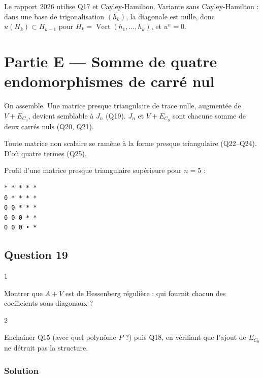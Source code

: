 \documentclass[11pt,a4paper]{article}
\begin{document}
\begin{methode}

Le rapport 2026 utilise Q17 et Cayley-Hamilton. Variante sans Cayley-Hamilton : dans une base de trigonalisation \((h_k)\), la diagonale est nulle, donc \(u(H_k)\subset H_{k-1}\) pour \(H_k=\operatorname{Vect}(h_1,\dots,h_k)\), et \(u^n=0\).

\end{methode}

\hypertarget{partie-e-somme-de-quatre-endomorphismes-de-carruxe9-nul}{%
\section{Partie E --- Somme de quatre endomorphismes de carré nul}\label{partie-e-somme-de-quatre-endomorphismes-de-carruxe9-nul}}

On assemble. Une matrice presque triangulaire de trace nulle, augmentée de \(V+E_{C_0}\), devient semblable à \(J_n\) (Q19). \(J_n\) et \(V+E_{C_0}\) sont chacune somme de deux carrés nuls (Q20, Q21).

Toute matrice non scalaire se ramène à la forme presque triangulaire (Q22--Q24). D'où quatre termes (Q25).

Profil d'une matrice presque triangulaire supérieure pour \(n=5\) :

\begin{lstlisting}
* * * * *
0 * * * *
0 0 * * *
0 0 0 * *
0 0 0 • *
\end{lstlisting}

\hypertarget{question-19}{%
\subsection{Question 19}\label{question-19}}

\begin{indication}{1}

Montrer que \(A+V\) est de Hessenberg régulière : qui fournit chacun des coefficients sous-diagonaux ?

\end{indication}

\begin{indication}{2}

Enchaîner Q15 (avec quel polynôme \(P\) ?) puis Q18, en vérifiant que l'ajout de \(E_{C_0}\) ne détruit pas la structure.

\end{indication}

\hypertarget{solution-18}{%
\subsubsection{Solution}\label{solution-18}}
\end{document}
